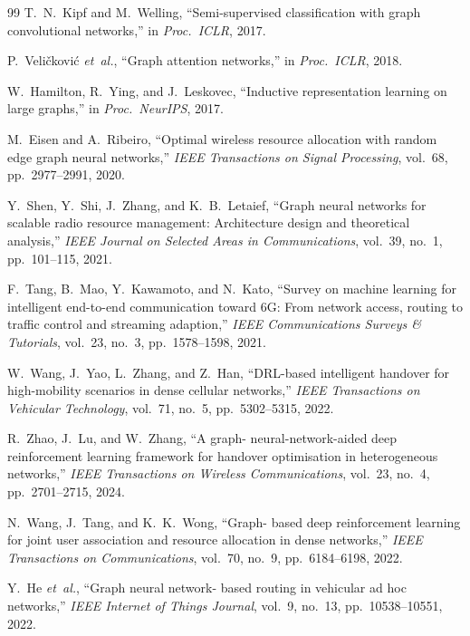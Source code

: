\documentclass[12pt,a4paper,oneside]{report}
\begin{document}
\begin{thebibliography}{99}
 T.~N.~Kipf and M.~Welling, ``Semi-supervised
classification with graph convolutional networks,'' in
\textit{Proc.\ ICLR}, 2017.

 P.~Veli\v{c}kovi\'c \textit{et~al.}, ``Graph
attention networks,'' in \textit{Proc.\ ICLR}, 2018.

 W.~Hamilton, R.~Ying, and J.~Leskovec,
``Inductive representation learning on large graphs,'' in
\textit{Proc.\ NeurIPS}, 2017.

 M.~Eisen and A.~Ribeiro, ``Optimal
wireless resource allocation with random edge graph neural networks,''
\textit{IEEE Transactions on Signal Processing}, vol.~68,
pp.~2977--2991, 2020.

 Y.~Shen, Y.~Shi, J.~Zhang, and
K.~B.~Letaief, ``Graph neural networks for scalable radio resource
management: Architecture design and theoretical analysis,''
\textit{IEEE Journal on Selected Areas in Communications}, vol.~39,
no.~1, pp.~101--115, 2021.

 F.~Tang, B.~Mao, Y.~Kawamoto, and N.~Kato,
``Survey on machine learning for intelligent end-to-end communication
toward 6G: From network access, routing to traffic control and streaming
adaption,'' \textit{IEEE Communications Surveys \& Tutorials},
vol.~23, no.~3, pp.~1578--1598, 2021.

 W.~Wang, J.~Yao, L.~Zhang, and Z.~Han,
``DRL-based intelligent handover for high-mobility scenarios in dense
cellular networks,'' \textit{IEEE Transactions on Vehicular
Technology}, vol.~71, no.~5, pp.~5302--5315, 2022.

 R.~Zhao, J.~Lu, and W.~Zhang, ``A graph-
neural-network-aided deep reinforcement learning framework for handover
optimisation in heterogeneous networks,'' \textit{IEEE Transactions on
Wireless Communications}, vol.~23, no.~4, pp.~2701--2715, 2024.

 N.~Wang, J.~Tang, and K.~K.~Wong, ``Graph-
based deep reinforcement learning for joint user association and
resource allocation in dense networks,'' \textit{IEEE Transactions on
Communications}, vol.~70, no.~9, pp.~6184--6198, 2022.

 Y.~He \textit{et~al.}, ``Graph neural network-
based routing in vehicular ad hoc networks,'' \textit{IEEE Internet of
Things Journal}, vol.~9, no.~13, pp.~10538--10551, 2022.


\end{thebibliography}
\end{document}
